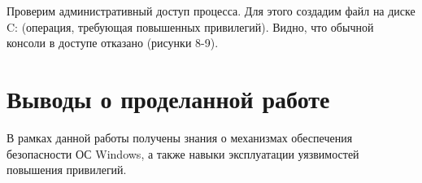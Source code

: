 \FloatBarrier

Проверим административный доступ процесса. Для этого создадим файл на диске C: (операция, требующая повышенных привилегий). Видно, что обычной консоли в доступе отказано (рисунки 8-9).
\FloatBarrier

\FloatBarrier

\section{Выводы о проделанной работе}
В рамках данной работы получены знания о механизмах обеспечения безопасности ОС Windows, а также навыки эксплуатации уязвимостей повышения привилегий. 

